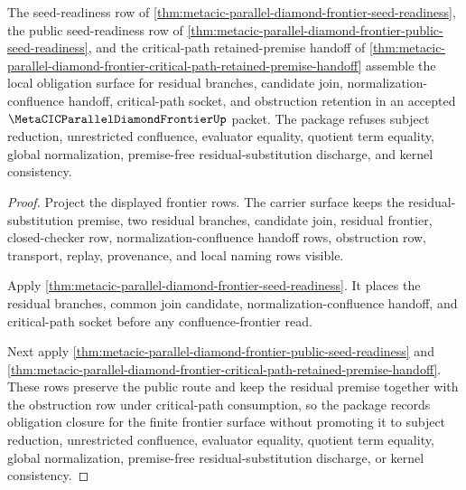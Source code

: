 \begin{theorem}
\label{thm:metacic-parallel-diamond-frontier-obligation-closure-package}
The seed-readiness row of \autoref{thm:metacic-parallel-diamond-frontier-seed-readiness}, the public seed-readiness row of \autoref{thm:metacic-parallel-diamond-frontier-public-seed-readiness}, and the critical-path retained-premise handoff of \autoref{thm:metacic-parallel-diamond-frontier-critical-path-retained-premise-handoff} assemble the local obligation surface for residual branches, candidate join, normalization-confluence handoff, critical-path socket, and obstruction retention in an accepted $\MetaCICParallelDiamondFrontierUp$ packet. The package refuses subject reduction, unrestricted confluence, evaluator equality, quotient term equality, global normalization, premise-free residual-substitution discharge, and kernel consistency.
\end{theorem}
\begin{proof}
Project the displayed frontier rows. The carrier surface keeps the residual-substitution premise, two residual branches, candidate join, residual frontier, closed-checker row, normalization-confluence handoff rows, obstruction row, transport, replay, provenance, and local naming rows visible.

Apply \autoref{thm:metacic-parallel-diamond-frontier-seed-readiness}. It places the residual branches, common join candidate, normalization-confluence handoff, and critical-path socket before any confluence-frontier read.

Next apply \autoref{thm:metacic-parallel-diamond-frontier-public-seed-readiness} and \autoref{thm:metacic-parallel-diamond-frontier-critical-path-retained-premise-handoff}. These rows preserve the public route and keep the residual premise together with the obstruction row under critical-path consumption, so the package records obligation closure for the finite frontier surface without promoting it to subject reduction, unrestricted confluence, evaluator equality, quotient term equality, global normalization, premise-free residual-substitution discharge, or kernel consistency.
\end{proof}

